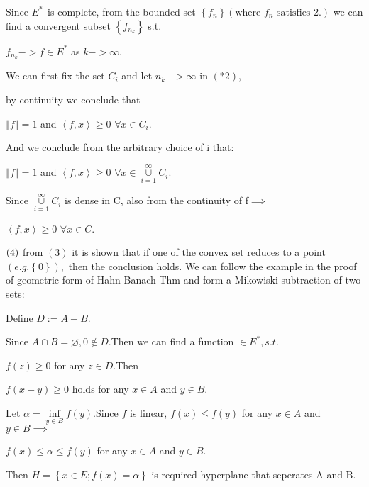 \documentclass{article}
\begin{document}
Since $E^{\ast \text{ }}$is complete, from the bounded set $\left\{
f_{n}\right\} \left( \text{where }f_{n}\text{ satisfies 2.}\right) $ we can
find a convergent subset $\left\{ f_{n_{k}}\right\} $ s.t. 

$f_{n_{k}}->f\in E^{\ast }$ as $k->\infty .$

We can first fix the set $C_{i}$ and let $n_{k}->\infty $ in $\left( \ast
2\right) ,$

by continuity we conclude that 

$\left\Vert f\right\Vert =1$ and $\left\langle f,x\right\rangle \geq 0$ $%
\forall x\in C_{i}.$

And we conclude from the arbitrary choice of i that:

$\left\Vert f\right\Vert =1$ and $\left\langle f,x\right\rangle \geq 0$ $%
\forall x\in \underset{i=1}{\overset{\infty }{\cup }}C_{i}.$

Since $\underset{i=1}{\overset{\infty }{\cup }}C_{i}$ is dense in C, also
from the continuity of f$\implies $

$\left\langle f,x\right\rangle \geq 0$ $\forall x\in C.$

$\bigskip \left( 4\right) $ from $\left( 3\right) $ it is shown that if one
of the convex set reduces to a point $\left( e.g.\left\{ 0\right\} \right) ,$
then the conclusion holds. We can follow the example in the proof of
geometric form of Hahn-Banach Thm and form a Mikowiski subtraction of two
sets:

Define $D:=A-B.$

Since $A\cap B=\varnothing ,0\notin D.$Then we can find a function $\in
E^{\ast },s.t.$

$f\left( z\right) \geq 0$ for any $z\in D.$Then

$f\left( x-y\right) \geq 0$ holds for any $x\in A$ and $y\in B.$

Let $\alpha =\underset{y\in B}{\inf }f\left( y\right) .$Since $f$ is linear, 
$f\left( x\right) \leq f\left( y\right) $ for any $x\in A$ and $y\in
B\implies $

$f\left( x\right) \leq \alpha \leq f\left( y\right) $ for any $x\in A$ and $%
y\in B$.

Then $H=\left\{ x\in E;f\left( x\right) =\alpha \right\} $ is required
hyperplane that seperates A and B.
\end{document}
